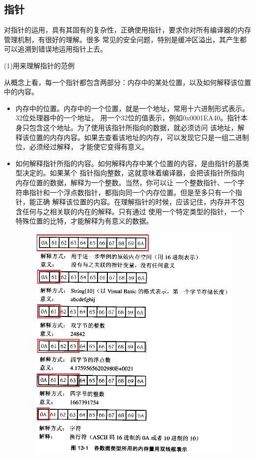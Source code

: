 \documentclass{article}
\begin{document}
\subsection{指针}
对指针的运用，具有其固有的复杂性，正确使用指针，要求你对所有编译器的内存管理机制，有很好的理解。很多
常见的安全问题，特别是缓冲区溢出，其产生都可以追溯到错误地运用指针上去。
\par
(1)用来理解指针的范例
\par
从概念上看，每一个指针都包含两部分：内存中的某处位置，以及如何解释该位置中的内容。
\begin{itemize}
    \item 内存中的位置。内存中的一个位置，就是一个地址，常用十六进制形式表示。32位处理器中的一个地址，
    用一个32位的值表示，例如0x0001EA40。指针本身只包含这个地址。为了使用该指针所指向的数据，就必须访问
    该地址，解释该位置的内存内容。如果去查看该地址的内存，可以发现它只是一组二进制位，必须经过解释，
    才能使它变得有意义。
    \item 如何解释指针所指的内容。如何解释内存中某个位置的内容，是由指针的基类型决定的。如果某个
    指针指向整数，这就意味着编译器，会把该指针所指向内存位置的数据，解释为一个整数。当然，你可以让
    一个整数指针、一个字符串指针和一个浮点数指针，都指向同一个内存位置。但是至多只有一个指针，能正确
    解释该位置的内容。在理解指针的时候，应该记住，内存并不包含任何与之相关联的内在的解释。只有通过
    使用一个特定类型的指针，一个特殊位置的比特，才能解释为有意义的数据。
    \begin{figure}[htb]
        \centering
        \includegraphics[width=15cm]{figure16.png}

\end{figure}
\end{itemize}
\end{document}
